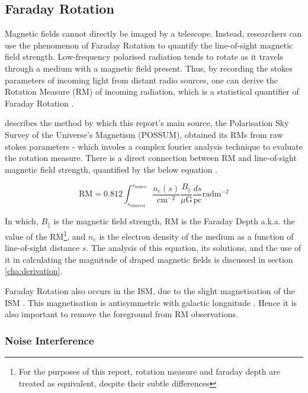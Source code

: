 \subsection{Faraday Rotation}
\label{ssec:faraday}

Magnetic fields cannot directly be imaged by a telescope. Instead, researchers can use the phenomenon of Faraday Rotation to quantify the line-of-sight magnetic field strength. Low-frequency polarised radiation tends to rotate as it travels through a medium with a magnetic field present. Thus, by recording the stokes parameters of incoming light from distant radio sources, one can derive the Rotation Measure (RM) of incoming radiation, which is a statistical quantifier of Faraday Rotation \citep{ID1, ID14}. 


\cite{ID1} describes the method by which this report's main source, the Polarisation Sky Survey of the Universe's Magnetism (POSSUM), obtained its RMs from raw stokes parameters - which involes a complex fourier analysis technique to evaluate the rotation measure. There is a direct connection between RM and line-of-sight magnetic field strength, quantified by the below equation \citep{ID5, ID1, ID26, ID27, ID30}.


\begin{equation}
    \mathrm{RM} = 0.812 \int_{s_{\mathrm{observer}}}^{s_{\mathrm{source}}}{\frac{n_e(s)}{\mathrm{cm^{-2}}}\frac{B_{\parallel}}{\mu\mathrm{G}}\frac{ds}{\mathrm{pc}}} \mathrm{rad m^{-2}}
    \label{eq:rm_integral}
\end{equation}


In which, $B_{\parallel}$ is the magnetic field strength, $\mathrm{RM}$ is the Faraday Depth a.k.a. the value of the RM\footnote{For the purposes of this report, rotation measure and faraday depth are treated as equivalent, despite their subtle differences}, and $n_e$ is the electron density of the medium as a function of line-of-sight distance $s$. The analysis of this equation, its solutions, and the use of it in calculating the magnitude of draped magnetic fields is discussed in section \ref{cha:derivation}.


Faraday Rotation also occurs in the ISM, due to the slight magnetisation of the ISM \citep{ID37, ID30, ID21}. This magnetisation is antisymmetric with galactic longnitude \citep{ID30}. Hence it is also important to remove the foreground from RM observations.


\subsubsection{Noise Interference}
\label{sssec:SNR}

